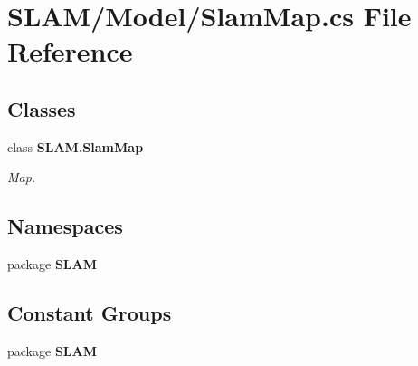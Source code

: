 \section{S\-L\-A\-M/\-Model/\-Slam\-Map.cs File Reference}
\label{_slam_map_8cs}
\subsection*{Classes}
\begin{DoxyCompactItemize}
\item 
class {\bf S\-L\-A\-M.\-Slam\-Map}
\begin{DoxyCompactList}\small\item\em Map. \end{DoxyCompactList}\end{DoxyCompactItemize}
\subsection*{Namespaces}
\begin{DoxyCompactItemize}
\item 
package {\bf S\-L\-A\-M}
\end{DoxyCompactItemize}
\subsection*{Constant Groups}
\begin{DoxyCompactItemize}
\item 
package {\bf S\-L\-A\-M}
\end{DoxyCompactItemize}
